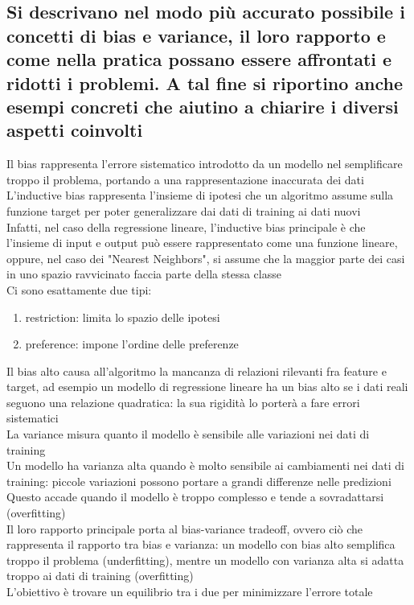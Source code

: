 \documentclass[10pt,oneside,a4paper]{article}
\begin{document}
	\subsection{Si descrivano nel modo più accurato possibile i concetti di bias e variance, il loro rapporto e come nella pratica possano essere affrontati e ridotti i problemi. A tal fine si riportino anche esempi concreti che aiutino a chiarire i diversi aspetti coinvolti}
	Il bias rappresenta l'errore sistematico introdotto da un modello nel semplificare troppo il problema, portando a una rappresentazione inaccurata dei dati\\
	L'inductive bias rappresenta l'insieme di ipotesi che un algoritmo assume sulla funzione target per poter generalizzare dai dati di training ai dati nuovi\\
	Infatti, nel caso della regressione lineare, l'inductive bias principale è che l'insieme di input e output può essere rappresentato come una funzione lineare, oppure, nel caso dei "Nearest Neighbors", si assume che la maggior parte dei casi in uno spazio ravvicinato faccia parte della stessa classe \\
	Ci sono esattamente due tipi:
	\begin{enumerate}
		\item restriction: limita lo spazio delle ipotesi
		\item preference: impone l'ordine delle preferenze
	\end{enumerate}
	Il bias alto causa all'algoritmo la mancanza di relazioni rilevanti fra feature e target, ad esempio un modello di regressione lineare ha un bias alto se i dati reali seguono una relazione quadratica: la sua rigidità lo porterà a fare errori sistematici\\
	La variance misura quanto il modello è sensibile alle variazioni nei dati di training\\
	Un modello ha varianza alta quando è molto sensibile ai cambiamenti nei dati di training: piccole variazioni possono portare a grandi differenze nelle predizioni\\
	Questo accade quando il modello è troppo complesso e tende a sovradattarsi (overfitting)\\
	Il loro rapporto principale porta al bias-variance tradeoff, ovvero ciò che rappresenta il rapporto tra bias e varianza: un modello con bias alto semplifica troppo il problema (underfitting), mentre un modello con varianza alta si adatta troppo ai dati di training (overfitting)\\
	L'obiettivo è trovare un equilibrio tra i due per minimizzare l'errore totale\\
\end{document}
